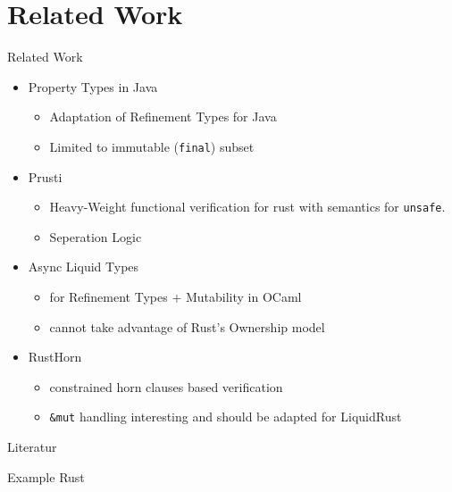 \documentclass{sdqbeamer}
\begin{document}
\section{Related Work}

\begin{frame}{Related Work}
  \begin{itemize}
    \item Property Types in Java\cite{lanzinger_property_2021}
      \begin{itemize}
        \item Adaptation of Refinement Types for Java
        \item Limited to immutable (\texttt{final}) subset
      \end{itemize}
    \item Prusti\cite{astrauskas_leveraging_2019}
      \begin{itemize} 
        \item Heavy-Weight functional verification for rust with semantics for \texttt{unsafe}.
        \item Seperation Logic
      \end{itemize}
    \item Async Liquid Types\cite{kloos_asynchronous_2015}
      \begin{itemize} 
        \item for Refinement Types + Mutability in OCaml
        \item cannot take advantage of Rust's Ownership model
      \end{itemize}
    \item RustHorn\cite{matsushita_rusthorn_2020}
      \begin{itemize} 
        \item constrained horn clauses based verification
        \item \texttt{\&mut} handling interesting and should be adapted for LiquidRust
      \end{itemize}
  \end{itemize}
\end{frame}


\appendix
\beginbackup



\begin{frame}{Literatur}

  \printbibliography
\end{frame}



\begin{frame}[fragile=singleslide]{Example Rust}
  \inputminted[fontsize=\small]{rust}{./rust-no-spec.rs}
\end{frame}
\end{document}
